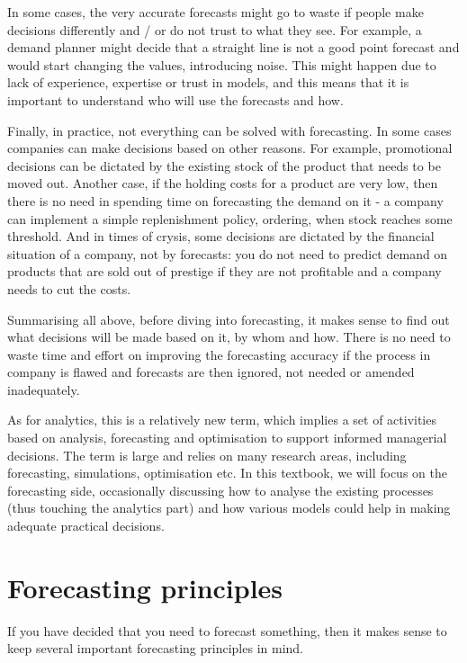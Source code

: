 \documentclass[
]{book}
\theoremstyle{definition}
\theoremstyle{definition}
\theoremstyle{definition}
\theoremstyle{definition}
\theoremstyle{remark}
\begin{document}
In some cases, the very accurate forecasts might go to waste if people make decisions differently and / or do not trust to what they see. For example, a demand planner might decide that a straight line is not a good point forecast and would start changing the values, introducing noise. This might happen due to lack of experience, expertise or trust in models, and this means that it is important to understand who will use the forecasts and how.

Finally, in practice, not everything can be solved with forecasting. In some cases companies can make decisions based on other reasons. For example, promotional decisions can be dictated by the existing stock of the product that needs to be moved out. Another case, if the holding costs for a product are very low, then there is no need in spending time on forecasting the demand on it - a company can implement a simple replenishment policy, ordering, when stock reaches some threshold. And in times of crysis, some decisions are dictated by the financial situation of a company, not by forecasts: you do not need to predict demand on products that are sold out of prestige if they are not profitable and a company needs to cut the costs.

Summarising all above, before diving into forecasting, it makes sense to find out what decisions will be made based on it, by whom and how. There is no need to waste time and effort on improving the forecasting accuracy if the process in company is flawed and forecasts are then ignored, not needed or amended inadequately.

As for analytics, this is a relatively new term, which implies a set of activities based on analysis, forecasting and optimisation to support informed managerial decisions. The term is large and relies on many research areas, including forecasting, simulations, optimisation etc. In this textbook, we will focus on the forecasting side, occasionally discussing how to analyse the existing processes (thus touching the analytics part) and how various models could help in making adequate practical decisions.

\hypertarget{forecastingPrinciples}{%
\section{Forecasting principles}\label{forecastingPrinciples}}

If you have decided that you need to forecast something, then it makes sense to keep several important forecasting principles in mind.
\end{document}
